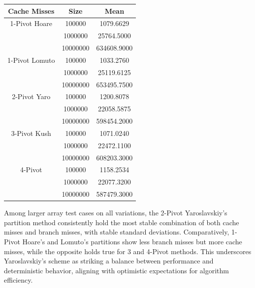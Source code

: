 \documentclass[a4paper,oneside,12pt]{book}
\begin{document}
\begin{center}
\small
\begin{tabular}{ |c c | c | }
    \hline
    Cache Misses    & Size     & Mean           \\
    \hline
    1-Pivot Hoare   & 100000   & 1079.6629      \\
                    & 1000000  & 25764.5000     \\
                    & 10000000 & 634608.9000    \\
    \hline
    1-Pivot Lomuto  & 100000   & 1033.2760      \\
                    & 1000000  & 25119.6125     \\
                    & 10000000 & 653495.7500    \\
    \hline
    2-Pivot Yaro    & 100000   & 1200.8078      \\
                    & 1000000  & 22058.5875     \\
                    & 10000000 & 598454.2000    \\
    \hline
    3-Pivot Kush    & 100000   & 1071.0240      \\
                    & 1000000  & 22472.1100     \\
                    & 10000000 & 608203.3000    \\
    \hline
    4-Pivot         & 100000   & 1158.2534      \\
                    & 1000000  & 22077.3200     \\
                    & 10000000 & 587479.3000    \\
    \hline
\end{tabular}
\end{center}

Among larger array test cases on all variations, the 2-Pivot Yaroslavskiy's partition method consistently hold the most stable combination of both cache misses and branch misses, with stable standard deviations.
Comparatively, 1-Pivot Hoare's and Lomuto's partitions show less branch misses but more cache misses, while the opposite holds true for 3 and 4-Pivot methods. This underscores Yaroslavskiy's scheme as striking a balance between performance and deterministic behavior, aligning with optimistic expectations for algorithm efficiency. 
\end{document}
